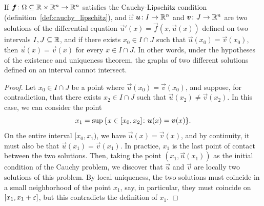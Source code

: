 \begin{proposition}
\label{prop:separazione_soluzioni}%
If $\boldsymbol f\colon \Omega\subseteq {\mathbb R} \times {\mathbb R}^n\to {\mathbb R}^n$ satisfies the
Cauchy-Lipschitz condition (definition~\ref{def:cauchy_lipschitz}), and if $\boldsymbol u\colon I \to {\mathbb R}^n$ and $\boldsymbol v\colon J\to{\mathbb R}^n$ are two solutions of the
differential equation $\vec u'(x) = \vec f(x,\vec u(x))$ defined on two
intervals $I,J \subseteq {\mathbb R}$, and if there exists $x_0\in I\cap J$ such that
$\vec u(x_0) = \vec v(x_0)$, then $\vec u(x) = \vec v(x)$ for every $x\in I\cap
J$. In other words, under the hypotheses of the existence and uniqueness
theorem, the graphs of two different solutions defined on an interval cannot
intersect.
\end{proposition}
%
\begin{proof}
Let $x_0 \in I\cap J$ be a point where $\vec u(x_0) = \vec v(x_0)$, and suppose,
for contradiction, that there exists $x_2 \in I\cap J$ such that $\vec
u(x_2)\neq \vec v(x_2)$. In this case, we can consider the point
\[
   x_1 = \sup {\left\{ x \in [x_0,x_2] \colon \boldsymbol u(x) = \boldsymbol v(x) \right\}}.
\]
On the entire interval $[x_0,x_1)$, we have $\vec u(x) = \vec v(x)$, and by
continuity, it must also be that $\vec u(x_1) =  \vec v(x_1)$. In practice,
$x_1$ is the last point of contact between the two solutions. Then, taking the
point $(x_1,\vec u(x_1))$ as the initial condition of the Cauchy problem, we
discover that $\vec u$ and $\vec v$ are locally two solutions of this problem.
By local uniqueness, the two solutions must coincide in a small neighborhood of
the point $x_1$, say, in particular, they must coincide on $[x_1,x_1+\varepsilon]$, but
this contradicts the definition of $x_1$.
\end{proof}

